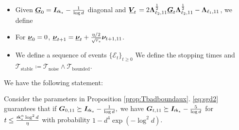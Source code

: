 \begin{itemize}[leftmargin=*]
\item Given $ \underline{\boldsymbol{G}}_{0} = \boldsymbol{I}_{\mathsf{rk}_{\star}} - \frac{1}{\log d }$ diagonal and $\mspace{2.2mu}\underline{\mspace{-2.2mu}\boldsymbol{V}\mspace{-2.2mu}}_{t} \mspace{2.2mu}  =    2 \boldsymbol{\Lambda}_{\ell_2,11}^{\frac{1}{2}} \underline{\boldsymbol{G}}_{t}  \boldsymbol{\Lambda}_{\ell_2,11}^{\frac{1}{2}} -   \boldsymbol{\Lambda}_{\ell_1,11}$,  we define
 \item For  $\underline{\boldsymbol{\nu}}_{0} = 0$,  $\underline{\boldsymbol{\nu}}_{t+1} =   \underline{\boldsymbol{\nu}}_{t}   +  \tfrac{\eta/2}{\sqrt{r_s}}   \boldsymbol{\nu}_{t+1,11}$.
\item We define a sequence of events $\{  \mathcal{E}_t \}_{t \geq 0}$
We define the stopping times
and  $\mathcal{T}_{\text{stable}} \coloneqq   \mathcal{T}_{\text{noise}}  \wedge  \mathcal{T}_{\text{bounded}} $.
\end{itemize}
We have the following statement:
\begin{proposition}
\label{prop:stable}
Consider  the parameters in Proposition   \ref{prop:Tbadboundaux}. 
\eqref{eq:sgd2} guarantees that if $\boldsymbol{G}_{0,11} \succeq \boldsymbol{I}_{\mathsf{rk}_{\star}} - \frac{1}{\log d },$  we have   $\boldsymbol{G}_{t,11} \succeq  \boldsymbol{I}_{\mathsf{rk}_{\star}}  - \frac{5}{\log d }$ for $t \leq  \frac{\mathsf{rk}_{\star}^{\alpha} \log^2 d}{\eta}$ with probability $1 - d^4 \exp(- \log^2 d)$.
\end{proposition}

